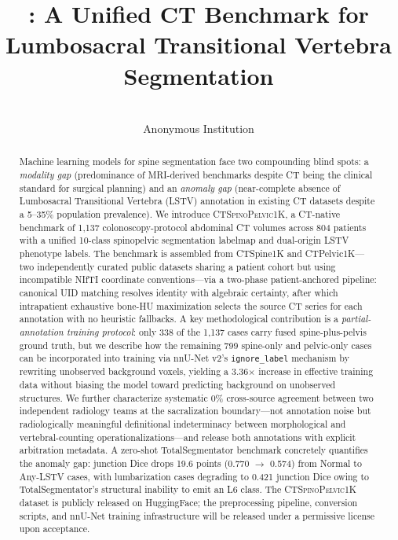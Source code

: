 \documentclass[pmlr]{jmlr}
\title[\dataset{}]{\dataset{}: A Unified CT Benchmark for Lumbosacral Transitional Vertebra Segmentation}
\author{%
  \Name{Anonymous Author(s)}
  \Email{anonymous@institution.edu}\\
  \addr Anonymous Institution
}
\newcommand{\dataset}{\textsc{CTSpinoPelvic1K}}
\begin{document}
\maketitle

\begin{abstract}
Machine learning models for spine segmentation face two compounding
blind spots: a \emph{modality gap} (predominance of MRI-derived
benchmarks despite CT being the clinical standard for surgical
planning) and an \emph{anomaly gap} (near-complete absence of
Lumbosacral Transitional Vertebra (LSTV) annotation in existing CT
datasets despite a 5--35\% population prevalence).
We introduce \dataset{}, a CT-native benchmark of 1{,}137
colonoscopy-protocol abdominal CT volumes across 804 patients
with a unified 10-class spinopelvic segmentation labelmap and
dual-origin LSTV phenotype labels.
The benchmark is assembled from CTSpine1K and CTPelvic1K---two
independently curated public datasets sharing a patient cohort but
using incompatible NIfTI coordinate conventions---via a two-phase
patient-anchored pipeline: canonical UID matching resolves identity
with algebraic certainty, after which intrapatient exhaustive
bone-HU maximization selects the source CT series for each
annotation with no heuristic fallbacks.
A key methodological contribution is a \emph{partial-annotation
training protocol}: only 338 of the 1{,}137 cases carry fused
spine-plus-pelvis ground truth, but we describe how the remaining
799 spine-only and pelvic-only cases can be incorporated into
training via nnU-Net v2's \texttt{ignore\_label} mechanism by
rewriting unobserved background voxels, yielding a 3.36$\times$
increase in effective training data without biasing the model
toward predicting background on unobserved structures.
We further characterize systematic 0\% cross-source agreement
between two independent radiology teams at the sacralization
boundary---not annotation noise but radiologically meaningful
definitional indeterminacy between morphological and
vertebral-counting operationalizations---and release both
annotations with explicit arbitration metadata.
A zero-shot TotalSegmentator benchmark concretely quantifies the
anomaly gap: junction Dice drops 19.6 points (0.770 $\rightarrow$
0.574) from Normal to Any-LSTV cases, with lumbarization cases
degrading to 0.421 junction Dice owing to TotalSegmentator's
structural inability to emit an L6 class.
The \dataset{} dataset is publicly released on HuggingFace;
the preprocessing pipeline, conversion scripts, and nnU-Net
training infrastructure will be released under a permissive
license upon acceptance.
\end{abstract}
\end{document}
